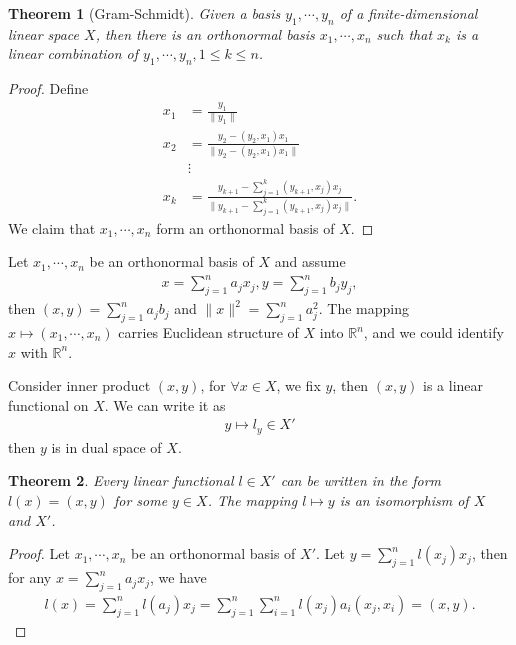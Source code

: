 \documentclass[11pt]{book}
\newtheorem{theorem}{Theorem}[section]
\theoremstyle{definition}
\numberwithin{equation}{chapter}
\begin{document}
\begin{theorem}[Gram-Schmidt]
Given a basis $y_1,\cdots,y_n$ of a finite-dimensional linear space $X$, then there is an orthonormal basis $x_1,\cdots,x_n$ such that $x_k$ is a linear combination of $y_1,\cdots,y_n, 1\leq k \leq n$.
\end{theorem}
\begin{proof}
Define
\begin{align*}
    x_1 & = \frac{y_1}{\|y_1\|} \\
    x_2 & = \frac{y_2 - (y_2,x_1)x_1}{\|y_2 - (y_2,x_1)x_1\|} \\
    & \vdots \\
    x_k & = \frac{y_{k+1} - \sum^k_{j=1}(y_{k+1},x_j)x_j}{\|y_{k+1} - \sum^k_{j=1}(y_{k+1},x_j)x_j\|}.
\end{align*}
We claim that $x_1,\cdots,x_n$ form an orthonormal basis of $X$.
\end{proof}

\medskip

Let $x_1,\cdots,x_n$ be an orthonormal basis of $X$ and assume 
\begin{align*}
    x = \sum^n_{j=1} a_j x_j, y = \sum^n_{j=1} b_j y_j,
\end{align*}
then $(x,y) = \sum^n_{j=1} a_jb_j$ and $\|x\|^2 = \sum^n_{j=1} a_j^2$.  The mapping $x\mapsto (x_1,\cdots,x_n)$ carries Euclidean structure of $X$ into $\mathbb{R}^n$, and we could identify $x$ with $\mathbb{R}^n$.

Consider inner product $(x,y)$, for $\forall x\in X$, we fix $y$, then $(x,y)$ is a linear functional on $X$. We can write it as 
\begin{align*}
    y \mapsto l_y \in X'
\end{align*}
then $y$ is in dual space of $X$.

\medskip

\begin{theorem}
Every linear functional $l\in X'$ can be written in the form $l(x) = (x,y)$ for some $y\in X$. The mapping $l \mapsto y$ is an isomorphism of $X$ and $X'$.
\end{theorem}
\begin{proof}
Let $x_1,\cdots,x_n$ be an orthonormal basis of $X'$. Let $y = \sum^n_{j=1}l(x_j)x_j$, then for any $x = \sum^n_{j=1}a_jx_j$, we have
\begin{align*}
    l(x) = \sum^n_{j=1}l(a_j) x_j = \sum^n_{j=1}\sum^n_{i=1} l(x_j) a_i (x_j, x_i) = (x,y).
\end{align*}
\end{proof}
\end{document}
